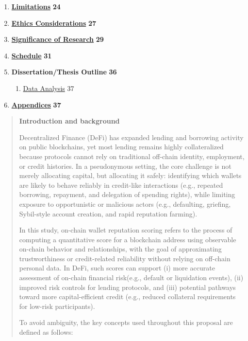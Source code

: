\documentclass[
]{article}
\begin{document}
\begin{enumerate}
  \begin{enumerate}
  \def\labelenumii{\arabic{enumii}.}
  \item
    \hyperref[research-design-and-method]{Research Design and Method} 21
  \item
    \hyperref[data-analysis]{Data Analysis} 23
  \end{enumerate}
\item
  \hyperref[jkv0mfuoi5pt]{\textbf{Limitations}} \textbf{24}
\item
  \hyperref[_1xt59ifs3pdx]{\textbf{Ethics Considerations}} \textbf{27}
\item
  \hyperref[_39etl5bqathq]{\textbf{Significance of Research}} \textbf{29}
\item
  \hyperref[ckhs5wg3oxgf]{\textbf{Schedule}} \textbf{31}
\item
  \textbf{Dissertation/Thesis Outline} \textbf{36}

  \begin{enumerate}
  \def\labelenumii{\arabic{enumii}.}
  \item
    \hyperref[data-analysis]{Data Analysis} 37
  \end{enumerate}
\item
  \hyperref[_782blh2d41sb]{\textbf{Appendices}} \textbf{37}
\end{enumerate}

\begin{quote}
\protect{}\label{gj4k9mjfpi2z}{}\textbf{Introduction and background}

Decentralized Finance (DeFi) has expanded lending and borrowing activity on public blockchains, yet most lending remains highly collateralized because protocols cannot rely on traditional off-chain identity, employment, or credit histories. In a pseudonymous setting, the core challenge is not merely allocating capital, but allocating it safely: identifying which wallets are likely to behave reliably in credit-like interactions (e.g., repeated borrowing, repayment, and delegation of spending rights), while limiting exposure to opportunistic or malicious actors (e.g., defaulting, griefing, Sybil-style account creation, and rapid reputation farming).

In this study, on-chain wallet reputation scoring refers to the process of computing a quantitative score for a blockchain address using observable on-chain behavior and relationships, with the goal of approximating trustworthiness or credit-related reliability without relying on off-chain personal data. In DeFi, such scores can support (i) more accurate assessment of on-chain financial risk(e.g., default or liquidation events), (ii) improved risk controls for lending protocols, and (iii) potential pathways toward more capital-efficient credit (e.g., reduced collateral requirements for low-risk participants).

To avoid ambiguity, the key concepts used throughout this proposal are defined as follows:
\end{quote}
\end{document}
